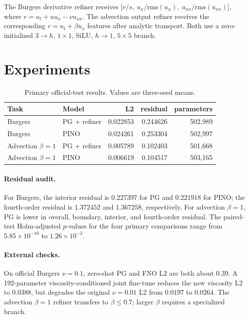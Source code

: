 \documentclass[11pt]{article}
\begin{document}
The Burgers derivative refiner receives
$\big[r/s,\ u_x/\mathrm{rms}(u_x),\ u_{xx}/\mathrm{rms}(u_{xx})\big]$,
where $r=u_t+uu_x-\nu u_{xx}$. The advection output refiner receives the
corresponding $r=u_t+\beta u_x$ features after analytic transport. Both use a
zero-initialized $3\rightarrow h$, $1\times1$, SiLU, $h\rightarrow1$,
$5\times5$ branch.

\section{Experiments}
\begin{table}[h]
\centering
\caption{Primary official-test results. Values are three-seed means.}
\begin{tabular}{llrrr}
\toprule
Task & Model & L2 & residual & parameters \\
\midrule
Burgers & PG + refiner & 0.022853 & 0.244626 & 502,989 \\
Burgers & PINO & 0.024261 & 0.253304 & 502,997 \\
Advection $\beta=1$ & PG + refiner & 0.005789 & 0.102403 & 501,668 \\
Advection $\beta=1$ & PINO & 0.006619 & 0.104517 & 503,165 \\
\bottomrule
\end{tabular}
\end{table}

\paragraph{Residual audit.}
For Burgers, the interior residual is $0.227397$ for PG and $0.221918$ for
PINO; the fourth-order residual is $1.372452$ and $1.367258$, respectively.
For advection $\beta=1$, PG is lower in overall, boundary, interior, and
fourth-order residual. The paired-test Holm-adjusted $p$-values for the four
primary comparisons range from $5.85\times10^{-10}$ to $1.26\times10^{-3}$.

\paragraph{External checks.}
On official Burgers $\nu=0.1$, zero-shot PG and FNO L2 are both about $0.39$.
A 192-parameter viscosity-conditioned joint fine-tune reduces the new
viscosity L2 to $0.0388$, but degrades the original $\nu=0.01$ L2 from $0.0197$
to $0.0264$. The advection $\beta=1$ refiner transfers to $\beta\le0.7$;
larger $\beta$ requires a specialized branch.
\end{document}
